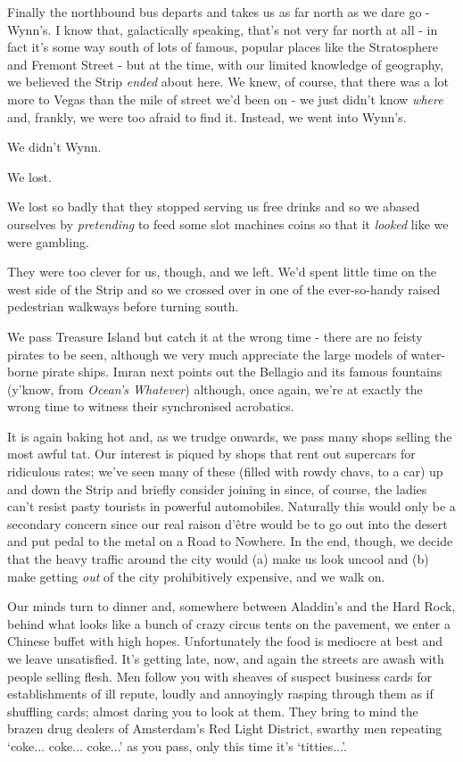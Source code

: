 \documentclass[a5paper,titlepage,11pt]{book}
\begin{document}
Finally the northbound bus departs and takes us as far north as we dare go - Wynn's. I know that, galactically speaking, that's not very far north at all - in fact it's some way south of lots of famous, popular places like the Stratosphere and Fremont Street - but at the time, with our limited knowledge of geography, we believed the Strip \emph{ended} about here. We knew, of course, that there was a lot more to Vegas than the mile of street we'd been on - we just didn't know \emph{where} and, frankly, we were too afraid to find it. Instead, we went into Wynn's.

We didn't Wynn.

We lost.

We lost so badly that they stopped serving us free drinks and so we abased ourselves by \emph{pretending} to feed some slot machines coins so that it \emph{looked} like we were gambling.

They were too clever for us, though, and we left. We'd spent little time on the west side of the Strip and so we crossed over in one of the ever-so-handy raised pedestrian walkways before turning south.

We pass Treasure Island but catch it at the wrong time - there are no feisty pirates to be seen, although we very much appreciate the large models of water-borne pirate ships. Imran next points out the Bellagio and its famous fountains (y'know, from \emph{Ocean's Whatever}) although, once again, we're at exactly the wrong time to witness their synchronised acrobatics.

It is again baking hot and, as we trudge onwards, we pass many shops selling the most awful tat. Our interest is piqued by shops that rent out supercars for ridiculous rates; we've seen many of these (filled with rowdy chavs, to a car) up and down the Strip and briefly consider joining in since, of course, the ladies can't resist pasty tourists in powerful automobiles. Naturally this would only be a secondary concern since our real raison d'\^{e}tre would be to go out into the desert and put pedal to the metal on a Road to Nowhere. In the end, though, we decide that the heavy traffic around the city would (a) make us look uncool and (b) make getting \emph{out} of the city prohibitively expensive, and we walk on.

Our minds turn to dinner and, somewhere between Aladdin's and the Hard Rock, behind what looks like a bunch of crazy circus tents on the pavement, we enter a Chinese buffet with high hopes. Unfortunately the food is mediocre at best and we leave unsatisfied. It's getting late, now, and again the streets are awash with people selling flesh. Men follow you with sheaves of suspect business cards for establishments of ill repute, loudly and annoyingly rasping through them as if shuffling cards; almost daring you to look at them. They bring to mind the brazen drug dealers of Amsterdam's Red Light District, swarthy men repeating `coke... coke... coke...' as you pass, only this time it's `titties...'.
\end{document}

